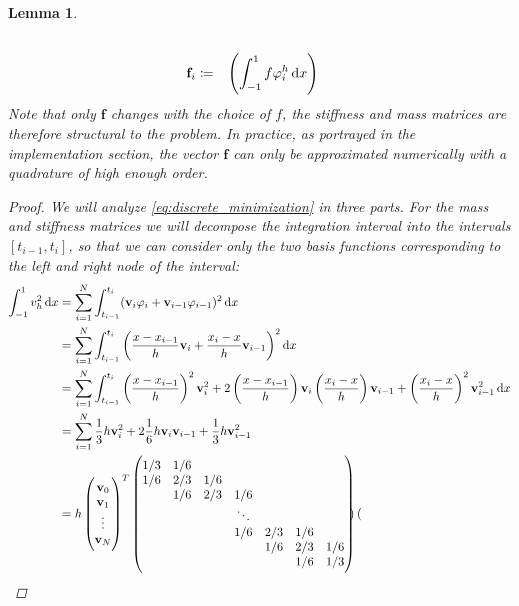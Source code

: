 \documentclass[headsepline,footsepline,footinclude=false,oneside,fontsize=11pt,paper=a4,listof=totoc,bibliography=totoc]{scrbook} %
\newtheorem{lemma}{Lemma}
\begin{document}
\begin{lemma}
\begin{align*}
		\\
		\mathbf{f}_i &\coloneqq \phantom{h} \left(\int_{-1}^1 f\varphi_i^h\dif x\right)
		\end{align*}
		Note that only $\mathbf{f}$ changes with the choice of $f$, the stiffness and mass matrices are therefore structural to the problem. In practice, as portrayed in the implementation section, the vector $\mathbf{f}$ can only be approximated numerically with a quadrature of high enough order.
		\begin{proof}
			We will analyze \eqref{eq:discrete_minimization} in three parts. For the mass and stiffness matrices we will decompose the integration interval into the intervals $[t_{i-1},t_i]$, so that we can consider only the two basis functions corresponding to the left and right node of the interval:
			\begin{align*}
				\int_{-1}^1 v_h^2 \dif x &= \sum_{i=1}^{N} \int_{t_{i-1}}^{t_i} (\mathbf{v}_i \varphi_i + \mathbf{v}_{i-1} \varphi_{i-1})^2 \dif x\\
				&= \sum_{i=1}^{N} \int_{t_{i-1}}^{t_i} \left(\frac{x-x_{i-1}}{h}\mathbf{v}_i + \frac{x_i-x}{h}\mathbf{v}_{i-1}\right)^2 \dif x \\
				&= \sum_{i=1}^{N} \int_{t_{i-1}}^{t_i} \left(\frac{x-x_{i-1}}{h}\right)^2 \mathbf{v}_i^2 + 2\left(\frac{x-x_{i-1}}{h}\right) \mathbf{v}_i \left(\frac{x_i-x}{h}\right) \mathbf{v}_{i-1} + \left(\frac{x_i-x}{h}\right)^2 \mathbf{v}_{i-1}^2 \dif x \\
				&= \sum_{i=1}^{N} \frac{1}{3}h \mathbf{v}_i^2 + 2\frac{1}{6}h\mathbf{v}_i \mathbf{v}_{i-1} + \frac{1}{3} h \mathbf{v}_{i-1}^2 \\
				&= h \begin{pmatrix}
					\mathbf{v}_0 \\					
					\mathbf{v}_1 \\
					\vdots \\
					\mathbf{v}_N 
				\end{pmatrix}^T
				\begin{pmatrix}
				1/3& 1/6 & & & & & \\
				1/6& 2/3& 1/6 & & & & \\
				& 1/6& 2/3& 1/6 & & & \\
				& & & \ddots & & & \\
				& & & 1/6& 2/3& 1/6 & \\
				& & & & 1/6& 2/3& 1/6 \\
				& & & & & 1/6& 1/3
				\end{pmatrix}
				\begin{pmatrix}

\end{pmatrix}
\end{align*}
\end{proof}
\end{lemma}
\end{document}
